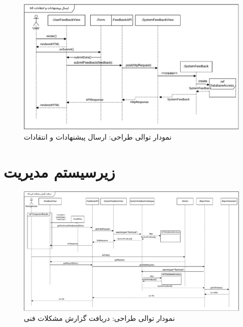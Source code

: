 \begin{figure}[ht!]
	\centering
	\includegraphics[scale=0.8]{figs/design-sequence/3-30.pdf}
	\caption{نمودار توالی طراحی: ارسال پیشنهادات و انتقادات}
\end{figure}

\FloatBarrier
\newpage

\section{زیرسیستم مدیریت}

\eject \pdfpagewidth=13in \pdfpageheight=9in

\FloatBarrier
\begin{figure}[ht!]
	\centering
	\includegraphics[scale=0.8]{figs/design-sequence/3-39.pdf}
	\caption{نمودار توالی طراحی: دریافت گزارش مشکلات فنی}
\end{figure}
\FloatBarrier
\newpage

\eject \pdfpagewidth=11in \pdfpageheight=9in


